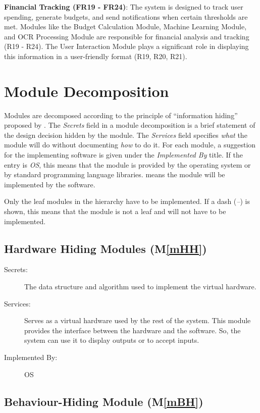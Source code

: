 \documentclass[12pt, titlepage]{article}
\newcommand{\mref}[1]{M\ref{#1}}
\begin{document}
\noindent \textbf{Financial Tracking (FR19 - FR24)}:  
The system is designed to track user spending, generate budgets, and send notifications when certain thresholds are met. Modules like the Budget Calculation Module, Machine Learning Module, and OCR Processing Module are responsible for financial analysis and tracking (R19 - R24). The User Interaction Module plays a significant role in displaying this information in a user-friendly format (R19, R20, R21).


\newpage

\section{Module Decomposition} \label{SecMD}

Modules are decomposed according to the principle of ``information hiding''
proposed by \citet{ParnasEtAl1984}. The \emph{Secrets} field in a module
decomposition is a brief statement of the design decision hidden by the
module. The \emph{Services} field specifies \emph{what} the module will do
without documenting \emph{how} to do it. For each module, a suggestion for the
implementing software is given under the \emph{Implemented By} title. If the
entry is \emph{OS}, this means that the module is provided by the operating
system or by standard programming language libraries.  \emph{\progname{}} means the
module will be implemented by the \progname{} software.

Only the leaf modules in the hierarchy have to be implemented. If a dash
(\emph{--}) is shown, this means that the module is not a leaf and will not have
to be implemented.

\subsection{Hardware Hiding Modules (\mref{mHH})}

\begin{description}
\item[Secrets:]The data structure and algorithm used to implement the virtual
  hardware.
\item[Services:]Serves as a virtual hardware used by the rest of the
  system. This module provides the interface between the hardware and the
  software. So, the system can use it to display outputs or to accept inputs.
\item[Implemented By:] OS
\end{description}

\subsection{Behaviour-Hiding Module (\mref{mBH})}
\end{document}
